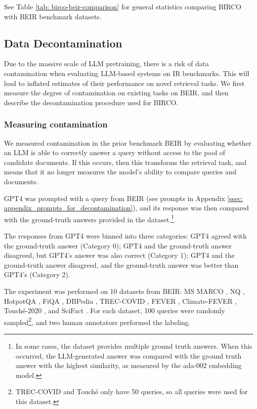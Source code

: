 \documentclass[11pt]{article}
\begin{document}
See Table \ref{tab: birco-beir-comparison} for general statistics comparing BIRCO with BEIR benchmark datasets.


\subsection{Data Decontamination}
Due to the massive scale of LLM pretraining, there is a risk of data contamination when evaluating LLM-based systems on IR benchmarks. This will lead to inflated estimates of their performance on novel retrieval tasks. We first measure the degree of contamination on existing tasks on BEIR, and then describe the decontamination procedure used for BIRCO.

\subsubsection{Measuring contamination}
We measured contamination in the prior benchmark BEIR by evaluating whether an LLM is able to correctly answer a query without access to the pool of candidate documents. If this occurs, then this transforms the retrieval task, and means that it no longer measures the model's ability to compare queries and documents.

\begin{samepage}

GPT4 was prompted with a query from BEIR (see prompts in Appendix \ref{ssec: appendix_prompts_for_decontamination}), and its response was then compared with the ground-truth answers provided in the dataset.\footnote{In some cases, the dataset provides multiple ground truth answers. When this occurred, the LLM-generated answer was compared with the ground truth answer with the highest similarity, as measured by the ada-002 embedding model.} 
\end{samepage}
The responses from GPT4 were binned into three categories: GPT4 agreed with the ground-truth answer (Category 0); GPT4 and the ground-truth answer disagreed, but GPT4's answer was also correct (Category 1); GPT4 and the ground-truth answer disagreed, and the ground-truth answer was better than GPT4's (Category 2).

The experiment was performed on 10 datasets from BEIR: MS MARCO \cite{msmarco}, NQ \cite{nq}, HotpotQA \cite{hotpotqa}, FiQA \cite{fiqa}, DBPedia \cite{dbp}, TREC-COVID \cite{trec-covid}, FEVER \cite{fever}, Climate-FEVER \cite{climate-fever}, Touché-2020 \cite{touche}, and SciFact \cite{scifact}. For each dataset, 100 queries were randomly sampled\footnote{TREC-COVID and Touché only have 50 queries, so all queries were used for this dataset.}, and two human annotators performed the labeling.
\end{document}
